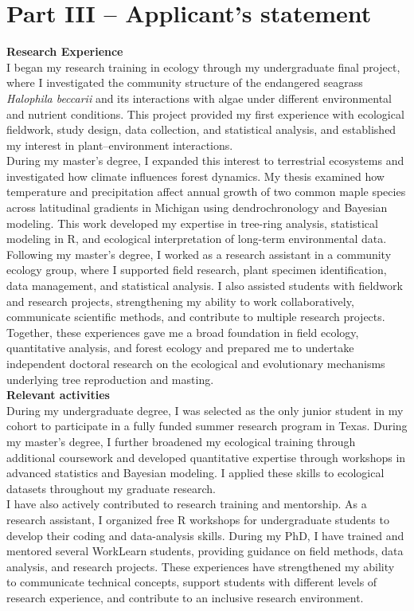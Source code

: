\documentclass[12pt]{article}
\begin{document}
\section*{Part III – Applicant’s statement}
\textbf{Research Experience}\\
I began my research training in ecology through my undergraduate final project, where I investigated the community structure of the endangered seagrass \textit{Halophila beccarii} and its interactions with algae under different environmental and nutrient conditions. This project provided my first experience with ecological fieldwork, study design, data collection, and statistical analysis, and established my interest in plant–environment interactions.\\
During my master’s degree, I expanded this interest to terrestrial ecosystems and investigated how climate influences forest dynamics. My thesis examined how temperature and precipitation affect annual growth of two common maple species across latitudinal gradients in Michigan using dendrochronology and Bayesian modeling. This work developed my expertise in tree-ring analysis, statistical modeling in R, and ecological interpretation of long-term environmental data.\\
Following my master’s degree, I worked as a research assistant in a community ecology group, where I supported field research, plant specimen identification, data management, and statistical analysis. I also assisted students with fieldwork and research projects, strengthening my ability to work collaboratively, communicate scientific methods, and contribute to multiple research projects.\\
Together, these experiences gave me a broad foundation in field ecology, quantitative analysis, and forest ecology and prepared me to undertake independent doctoral research on the ecological and evolutionary mechanisms underlying tree reproduction and masting.\\
\textbf{Relevant activities}\\
During my undergraduate degree, I was selected as the only junior student in my cohort to participate in a fully funded summer research program in Texas. During my master’s degree, I further broadened my ecological training through additional coursework and developed quantitative expertise through workshops in advanced statistics and Bayesian modeling. I applied these skills to ecological datasets throughout my graduate research.\\
I have also actively contributed to research training and mentorship. As a research assistant, I organized free R workshops for undergraduate students to develop their coding and data-analysis skills. During my PhD, I have trained and mentored several WorkLearn students, providing guidance on field methods, data analysis, and research projects. These experiences have strengthened my ability to communicate technical concepts, support students with different levels of research experience, and contribute to an inclusive research environment.\\
\end{document}
